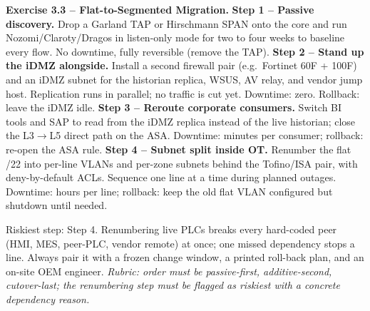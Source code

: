 \documentclass[11pt,a4paper]{article}
\begin{document}
\begin{solutionbox}
\textbf{Exercise 3.3 -- Flat-to-Segmented Migration.}
\textbf{Step 1 -- Passive discovery.} Drop a Garland TAP or Hirschmann SPAN onto the core and run Nozomi/Claroty/Dragos in listen-only mode for two to four weeks to baseline every flow. No downtime, fully reversible (remove the TAP).
\textbf{Step 2 -- Stand up the iDMZ alongside.} Install a second firewall pair (e.g.\ Fortinet 60F + 100F) and an iDMZ subnet for the historian replica, WSUS, AV relay, and vendor jump host. Replication runs in parallel; no traffic is cut yet. Downtime: zero. Rollback: leave the iDMZ idle.
\textbf{Step 3 -- Reroute corporate consumers.} Switch BI tools and SAP to read from the iDMZ replica instead of the live historian; close the L3$\to$L5 direct path on the ASA. Downtime: minutes per consumer; rollback: re-open the ASA rule.
\textbf{Step 4 -- Subnet split inside OT.} Renumber the flat /22 into per-line VLANs and per-zone subnets behind the Tofino/ISA pair, with deny-by-default ACLs. Sequence one line at a time during planned outages. Downtime: hours per line; rollback: keep the old flat VLAN configured but shutdown until needed.

Riskiest step: Step 4. Renumbering live PLCs breaks every hard-coded peer (HMI, MES, peer-PLC, vendor remote) at once; one missed dependency stops a line. Always pair it with a frozen change window, a printed roll-back plan, and an on-site OEM engineer. \emph{Rubric: order must be passive-first, additive-second, cutover-last; the renumbering step must be flagged as riskiest with a concrete dependency reason.}
\end{solutionbox}
\end{document}

